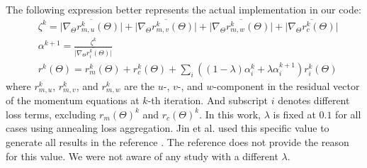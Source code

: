 The following expression better represents the actual implementation in our code:
\begin{equation}\label{eq:annealing-in-this-work}
    \begin{aligned}
        &\zeta^k =
            \overline{\lvert\nabla_\Theta r_{m,u}^k(\Theta)\rvert} +
            \overline{\lvert\nabla_\Theta r_{m,v}^k(\Theta)\rvert} +
            \overline{\lvert\nabla_\Theta r_{m,w}^k(\Theta)\rvert} +
            \overline{\lvert\nabla_\Theta r_{c}^k(\Theta)\rvert} \\
        &\alpha^{k+1} = 
            \frac{\zeta^k}{\overline{\lvert\nabla_\Theta r_i^k(\Theta)\rvert}} \\
        &r^k(\Theta) = r_m^k(\Theta) + r_c^k(\Theta) + 
            \sum\limits_{i} \left(\left(1-\lambda\right)\alpha_i^k + \lambda\alpha_i^{k+1}\right) r_i^k(\Theta)
    \end{aligned}
\end{equation}
where $r_{m,u}^k$, $r_{m,v}^k$, and $r_{m,w}^k$ are the $u$-, $v$-, and $w$-component in the residual vector of the momentum equations at $k$-th iteration.
And subscript $i$ denotes different loss terms, excluding $r_m(\Theta)^k$ and $r_c(\Theta)^k$.
In this work, $\lambda$ is fixed at $0.1$ for all cases using annealing loss aggregation.
Jin et al. used this specific value to generate all results in the reference \cite{jin_nsfnets_2020}. 
The reference does not provide the reason for this value.
We were not aware of any study with a different $\lambda$.
